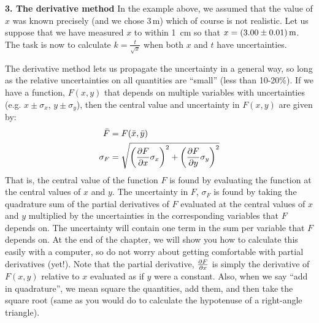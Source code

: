 \textbf{3. The derivative method}
In the example above, we assumed that the value of $x$ was known precisely (and we chose 3\,m) which of course is not realistic. Let us suppose that we have measured $x$ to within \SI{1}{cm} so that $x=\SI{3.00 \pm 0.01}{m}$. The task is now to calculate $k=\frac{t}{\sqrt{x}}$ when both $x$ and $t$ have uncertainties.

The derivative method lets us propagate the uncertainty in a general way, so long as the relative uncertainties on all quantities are ``small'' (less than 10-20\%). If we have a function, $F(x,y)$ that depends on multiple variables with uncertainties (e.g. $x\pm\sigma_x$, $y\pm\sigma_y$), then the central value and uncertainty in $F(x,y)$ are given by:
\begin{align}
\bar F &= F(\bar x, \bar y) \nonumber \\
\sigma_F &= \sqrt{\left(\frac{\partial F}{\partial x}\sigma_x \right)^2 + \left(\frac{\partial F}{\partial y}\sigma_y \right)^2 }
\end{align}
That is, the central value of the function $F$ is found by evaluating the function at the central values of $x$ and $y$. The uncertainty in $F$, $\sigma_F$ is found by taking the quadrature sum of the partial derivatives of $F$ evaluated at the central values of $x$ and $y$ multiplied by the uncertainties in the corresponding variables that $F$ depends on. The uncertainty will contain one term in the sum per variable that $F$ depends on. At the end of the chapter, we will show you how to calculate this easily with a computer, so do not worry about getting comfortable with partial derivatives (yet!). Note that the partial derivative, $\frac{\partial F}{\partial x}$ is simply the derivative of $F(x,y)$ relative to $x$ evaluated as if $y$ were a constant. Also, when we say ``add in quadrature'', we mean square the quantities, add them, and then take the square root (same as you would do to calculate the hypotenuse of a right-angle triangle).

